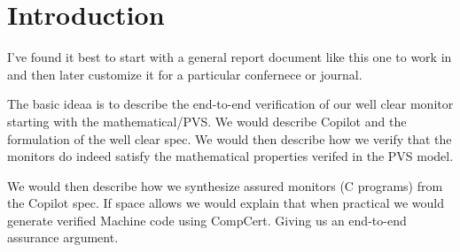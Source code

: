 \section{Introduction}\label{sec:intro}

I've found it best to start with a general report document like this one to work in and then later customize it for a particular
 confernece or journal. 


The basic ideaa is to describe the end-to-end verification of our well clear monitor
 starting with the mathematical/PVS. We would describe Copilot and the formulation of the well clear spec. We would then describe how we verify that the monitors do indeed satisfy the mathematical properties verifed in the PVS model. 

We would then describe how we synthesize assured monitors (C programs) from the Copilot spec. If space allows we would explain that when practical we would generate verified Machine code  using CompCert. Giving us an end-to-end assurance argument.   
